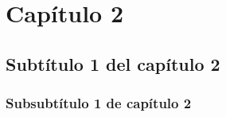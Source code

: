 \newpage

\begin{center}
\vspace*{15em}
{\huge\bfseries\color{blue}{Capítulo 2}\par}
{\huge\bfseries\color{blue}{Segundo Capítulo}\par}
\end{center}
\chapter{Capítulo 2}
\section{Subtítulo 1 del capítulo 2}
\subsection{Subsubtítulo 1 de capítulo 2}